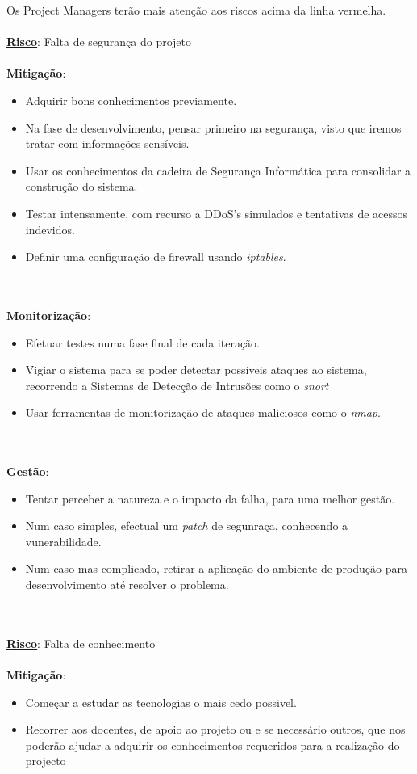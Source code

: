\documentclass[12pt, a4paper, twoside]{report} %
\begin{document}
Os Project Managers terão mais atenção aos riscos acima da linha vermelha.
\\
\\
\noindent \underline{\textbf{Risco}}: Falta de segurança do projeto
\\
\\
\textbf{Mitigação}:
\begin{itemize}
\item Adquirir bons conhecimentos previamente.
\item Na fase de desenvolvimento, pensar primeiro na segurança, visto que iremos
tratar com informações sensíveis.
\item Usar os conhecimentos da cadeira de Segurança Informática para consolidar a construção do sistema.
\item Testar intensamente, com recurso a DDoS's simulados e tentativas de acessos indevidos.
\item Definir uma configuração de firewall usando \textit{iptables}.
\end{itemize}
\\
\\
\textbf{Monitorização}:
\begin{itemize}
\item Efetuar testes numa fase final de cada iteração.
\item Vigiar o sistema para se poder detectar possíveis ataques ao sistema, recorrendo a Sistemas de Detecção de Intrusões como o \textit{snort}
\item Usar ferramentas de monitorização de ataques maliciosos como o \textit{nmap}.
\end{itemize}
\\
\\
\textbf{Gestão}:
\begin{itemize}
\item Tentar perceber a natureza e o impacto da falha, para uma melhor gestão.
\item Num caso simples, efectual um \textit{patch} de segunraça, conhecendo a vunerabilidade.
\item Num caso mas complicado, retirar a aplicação do ambiente de produção para desenvolvimento até resolver o problema.
\end{itemize}
\\
\\
\noindent \underline{\textbf{Risco}}: Falta de conhecimento
\\
\\
\textbf{Mitigação}:
\begin{itemize}
\item Começar a estudar as tecnologias o mais cedo possivel.
\item Recorrer aos docentes, de apoio ao projeto ou e se necessário outros, que nos poderão ajudar a adquirir os conhecimentos requeridos para a realização do projecto
\end{itemize}
\end{document}
